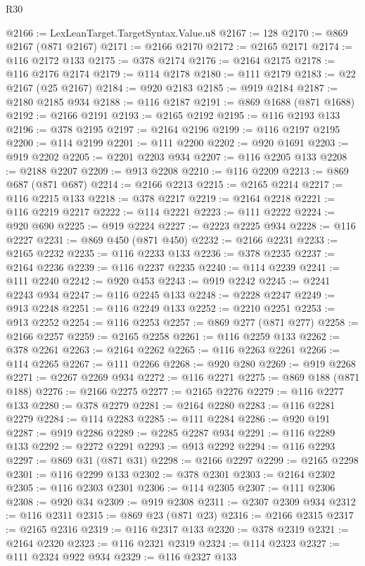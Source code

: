 \begin{lexlean}{R30}
\begin{coremodule}
@2166 := LexLeanTarget.TargetSyntax.Value.u8
@2167 := 128
@2170 := @869 @2167 (@871 @2167)
@2171 := @2166 @2170
@2172 := @2165 @2171
@2174 := @116 @2172 @133
@2175 := @378 @2174
@2176 := @2164 @2175
@2178 := @116 @2176 @2174
@2179 := @114 @2178
@2180 := @111 @2179
@2183 := @22 @2167 (@25 @2167)
@2184 := @920 @2183
@2185 := @919 @2184
@2187 := @2180 @2185 @934
@2188 := @116 @2187
@2191 := @869 @1688 (@871 @1688)
@2192 := @2166 @2191
@2193 := @2165 @2192
@2195 := @116 @2193 @133
@2196 := @378 @2195
@2197 := @2164 @2196
@2199 := @116 @2197 @2195
@2200 := @114 @2199
@2201 := @111 @2200
@2202 := @920 @1691
@2203 := @919 @2202
@2205 := @2201 @2203 @934
@2207 := @116 @2205 @133
@2208 := @2188 @2207
@2209 := @913 @2208
@2210 := @116 @2209
@2213 := @869 @687 (@871 @687)
@2214 := @2166 @2213
@2215 := @2165 @2214
@2217 := @116 @2215 @133
@2218 := @378 @2217
@2219 := @2164 @2218
@2221 := @116 @2219 @2217
@2222 := @114 @2221
@2223 := @111 @2222
@2224 := @920 @690
@2225 := @919 @2224
@2227 := @2223 @2225 @934
@2228 := @116 @2227
@2231 := @869 @450 (@871 @450)
@2232 := @2166 @2231
@2233 := @2165 @2232
@2235 := @116 @2233 @133
@2236 := @378 @2235
@2237 := @2164 @2236
@2239 := @116 @2237 @2235
@2240 := @114 @2239
@2241 := @111 @2240
@2242 := @920 @453
@2243 := @919 @2242
@2245 := @2241 @2243 @934
@2247 := @116 @2245 @133
@2248 := @2228 @2247
@2249 := @913 @2248
@2251 := @116 @2249 @133
@2252 := @2210 @2251
@2253 := @913 @2252
@2254 := @116 @2253
@2257 := @869 @277 (@871 @277)
@2258 := @2166 @2257
@2259 := @2165 @2258
@2261 := @116 @2259 @133
@2262 := @378 @2261
@2263 := @2164 @2262
@2265 := @116 @2263 @2261
@2266 := @114 @2265
@2267 := @111 @2266
@2268 := @920 @280
@2269 := @919 @2268
@2271 := @2267 @2269 @934
@2272 := @116 @2271
@2275 := @869 @188 (@871 @188)
@2276 := @2166 @2275
@2277 := @2165 @2276
@2279 := @116 @2277 @133
@2280 := @378 @2279
@2281 := @2164 @2280
@2283 := @116 @2281 @2279
@2284 := @114 @2283
@2285 := @111 @2284
@2286 := @920 @191
@2287 := @919 @2286
@2289 := @2285 @2287 @934
@2291 := @116 @2289 @133
@2292 := @2272 @2291
@2293 := @913 @2292
@2294 := @116 @2293
@2297 := @869 @31 (@871 @31)
@2298 := @2166 @2297
@2299 := @2165 @2298
@2301 := @116 @2299 @133
@2302 := @378 @2301
@2303 := @2164 @2302
@2305 := @116 @2303 @2301
@2306 := @114 @2305
@2307 := @111 @2306
@2308 := @920 @34
@2309 := @919 @2308
@2311 := @2307 @2309 @934
@2312 := @116 @2311
@2315 := @869 @23 (@871 @23)
@2316 := @2166 @2315
@2317 := @2165 @2316
@2319 := @116 @2317 @133
@2320 := @378 @2319
@2321 := @2164 @2320
@2323 := @116 @2321 @2319
@2324 := @114 @2323
@2327 := @111 @2324 @922 @934
@2329 := @116 @2327 @133

\end{coremodule}
\end{lexlean}
